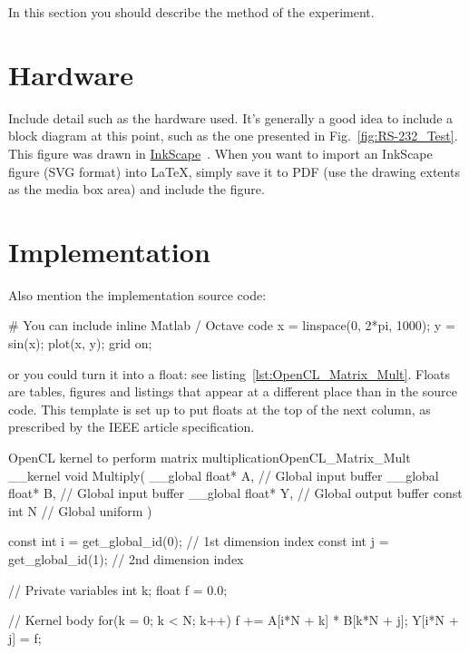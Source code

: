 
In this section you should describe the method of the experiment.

\section{Hardware}

Include detail such as the hardware used.  It's generally a good idea to include a block diagram at this point, such as the one presented in Fig.~\ref{fig:RS-232_Test}.  This figure was drawn in \href{http://www.inkscape.org/}{InkScape}~\cite{InkScape}.  When you want to import an InkScape figure (SVG format) into \LaTeX{}, simply save it to PDF (use the drawing extents as the media box area) and include the figure.


\section{Implementation}

Also mention the implementation source code:

\begin{Matlab}
  # You can include inline Matlab / Octave code
  x = linspace(0, 2*pi, 1000);
  y = sin(x);
  plot(x, y); grid on;
\end{Matlab}

or you could turn it into a float: see listing~\ref{lst:OpenCL_Matrix_Mult}.  Floats are tables, figures and listings that appear at a different place than in the source code.  This template is set up to put floats at the top of the next column, as prescribed by the IEEE article specification.

\begin{OpenCL_float}{OpenCL kernel to perform matrix multiplication}{OpenCL_Matrix_Mult}
  __kernel void Multiply(
    __global float* A, // Global input buffer
    __global float* B, // Global input buffer
    __global float* Y, // Global output buffer
      const  int    N  // Global uniform
  ){
    const int i = get_global_id(0); // 1st dimension index
    const int j = get_global_id(1); // 2nd dimension index
   
    // Private variables
    int   k;
    float f = 0.0;
   
    // Kernel body
    for(k = 0; k < N; k++) f += A[i*N + k] * B[k*N + j];
    Y[i*N + j] = f;
  }
\end{OpenCL_float}


